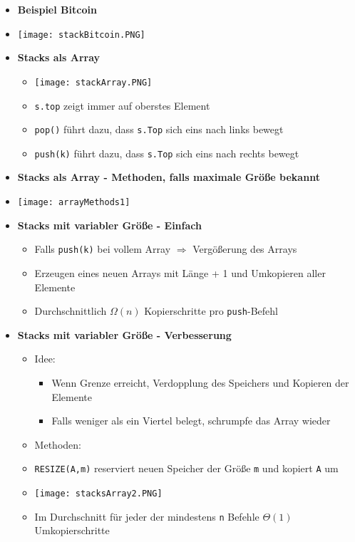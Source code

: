 \begin{itemize}
        \item \textbf{Beispiel Bitcoin}
        \item[] \texttt{[image: stackBitcoin.PNG]}
        
        \item \textbf{Stacks als Array}
            \begin{itemize}
                \item[] \texttt{[image: stackArray.PNG]}  
                \item \texttt{s.top} zeigt immer auf oberstes Element 
                \item \texttt{pop()} führt dazu, dass \texttt{s.Top} sich eins nach links bewegt
                \item \texttt{push(k)} führt dazu, dass \texttt{s.Top} sich eins nach rechts bewegt
            \end{itemize}

        \item \textbf{Stacks als Array - Methoden, falls maximale Größe bekannt}
        \item[] \texttt{[image: arrayMethods1]}

        \item \textbf{Stacks mit variabler Größe - Einfach}
            \begin{itemize}
                \item Falls \texttt{push(k)} bei vollem Array $\Rightarrow$ Vergößerung des Arrays
                \item Erzeugen eines neuen Arrays mit Länge + 1 und Umkopieren aller Elemente
                \item Durchschnittlich $\Omega(n)$ Kopierschritte pro \texttt{push}-Befehl
            \end{itemize}

        \item \textbf{Stacks mit variabler Größe - Verbesserung}
            \begin{itemize}
                \item Idee: 
                    \begin{itemize}
                        \item Wenn Grenze erreicht, Verdopplung des Speichers und Kopieren der Elemente
                        \item Falls weniger als ein Viertel belegt, schrumpfe das Array wieder 
                    \end{itemize}
                \item Methoden:
                \item[] \texttt{RESIZE(A,m)} reserviert neuen Speicher der Grö\ss e \texttt{m} und kopiert \texttt{A} um
                \item[] \texttt{[image: stacksArray2.PNG]}

                \item Im Durchschnitt für jeder der mindestens \texttt{n} Befehle $\Theta(1)$ Umkopierschritte
                
            \end{itemize}
    \end{itemize}

